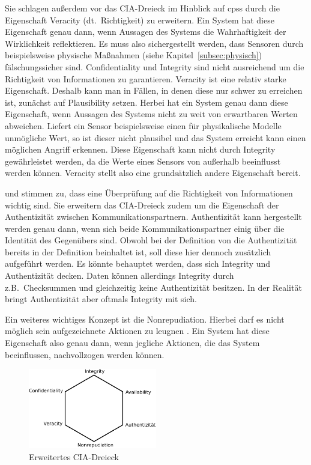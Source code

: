 \documentclass[final,bibliography=totocnumbered]{include/sikseminar}
\newcommand{\cps}{\glspl{cps}\xspace}
\begin{document}
Sie schlagen außerdem vor das CIA-Dreieck im Hinblick auf \cps durch die Eigenschaft Veracity (dt.~Richtigkeit) zu erweitern.
Ein System hat diese Eigenschaft genau dann, wenn Aussagen des Systems die Wahrhaftigkeit der  Wirklichkeit reflektieren.
Es muss also sichergestellt werden, dass Sensoren durch beispielsweise physische Maßnahmen (siehe Kapitel~\ref{subsec:physisch}) fälschungssicher sind.
Confidentiality und Integrity sind nicht ausreichend um die Richtigkeit von Informationen zu garantieren.
Veracity ist eine relativ starke Eigenschaft.
Deshalb kann man in Fällen, in denen diese nur schwer zu erreichen ist, zunächst auf Plausibility setzen.
Herbei hat ein System genau dann diese Eigenschaft, wenn Aussagen des Systems nicht zu weit von erwartbaren Werten abweichen.
Liefert ein Sensor beispielsweise einen für physikalische Modelle unmögliche Wert, so ist dieser nicht plausibel und das System erreicht kann einen möglichen Angriff erkennen. \cite{GK16}
Diese Eigenschaft kann nicht durch Integrity gewährleistet werden, da die Werte eines Sensors von außerhalb beeinflusst werden können.
Veracity stellt also eine grundsätzlich andere Eigenschaft bereit.

\citeauthor{WYX+10} und \citeauthor{SFJ2017} stimmen zu, dass eine Überprüfung auf die Richtigkeit von Informationen wichtig sind.
Sie erweitern das CIA-Dreieck zudem um die Eigenschaft der Authentizität zwischen Kommunikationspartnern.
Authentizität kann hergestellt werden genau dann, wenn sich beide Kommunikationspartner einig über die Identität des Gegenübers sind.\label{def:authenticity}
Obwohl bei der Definition von \citeauthor{Cherdantseva2013} die Authentizität bereits in der Definition beinhaltet ist, soll diese hier dennoch zusätzlich aufgeführt werden.
Es könnte behauptet werden, dass sich Integrity und Authentizität decken.
Daten können allerdings Integrity durch z.B.\ Checksummen und gleichzeitig keine Authentizität besitzen.
In der Realität bringt Authentizität aber oftmals Integrity mit sich.

Ein weiteres wichtiges Konzept ist die Nonrepudiation.
Hierbei darf es nicht möglich sein aufgezeichnete Aktionen zu leugnen \cite{NIST2013}.
Ein System hat diese Eigenschaft also genau dann, wenn jegliche Aktionen, die das System beeinflussen, nachvollzogen werden können. \label{def:nonrepudiation}

\begin{figure}
    \centering
    \includegraphics[width=0.5\textwidth]{triad}
    \caption{Erweitertes CIA-Dreieck}
    \label{fig:triad}
\end{figure}
\end{document}
